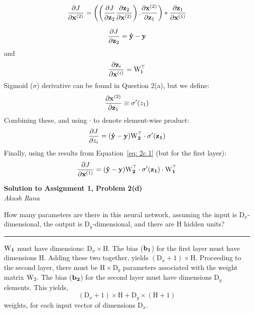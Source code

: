 \documentclass[letter,12pt]{article}
\newcommand{\myhwtitle}[3]
{\begin{center}
{\large {\bf Solution to Assignment {#1}, Problem {#2}}}\\
\medskip
{\it {#3}} %
\end{center}}
\newcommand{\solutionsAuthor}{Akash Rana}
\begin{document}
\begin{equation}
\frac{\partial{J}}{\partial{\bf x}^{(2)}}  = \left( \left(\frac{\partial{J}}{\partial{\bf z}_{2}}  \frac{\partial{\bf z}_{2}}{\partial{\bf x}^{(2)}}\right) . \frac{\partial{\bf x}^{(2)}}{\partial{\bf z}_{1}} \right) * \frac{\partial{\bf z}_{1}}{\partial{\bf x}^{(1)}}
\end{equation}

\begin{equation}
\frac{\partial{J}}{\partial{\bf z}_{2}} = \bf{\hat{y}} - \bf{y}
\end{equation}
and
\begin{equation}
\frac{\partial{\bf z}_{i}}{\partial{{\bf x}^{(i)}}} = {\bf \textrm{W}^{\top}_{i}}\label{eq: 2c 1}
\end{equation}
Sigmoid ($\sigma$) derivative can be found in Question 2(a), but we define:
\begin{equation}
\frac{\partial{{\bf x}^{(2)}}}{\partial{{\bf z}_{1}}}\equiv\sigma^{\prime}(z_{1})%
\end{equation}
Combining these, and using $\cdot$ to denote element-wise product:
\begin{equation}
\frac{\partial{J}}{\partial{z_{i}}} = (\bf{\hat{y}} - \bf{y}){\bf \textrm{W}^{\top}_{2}}\cdot\sigma^{\prime}(z_{1})
\end{equation}
Finally, using the results from Equation~\ref{eq: 2c 1} (but for the first layer):
\begin{equation}
\frac{\partial{J}}{\partial{{\bf x}^{(1)}}} = (\bf{\hat{y}} - \bf{y}){\bf \textrm{W}^{\top}_{2}}\cdot\sigma^{\prime}(z_{1})\cdot{\bf \textrm{W}^{\top}_{1}}
\end{equation}

\clearpage

\myhwtitle{1}{2(d)}{\solutionsAuthor}
\bigskip
\noindent How many parameters are there in this neural network, assuming the input is $\textrm{D}_{x}$-dimensional,
the output is $\textrm{D}_{y}$-dimensional, and there are H hidden units?\vspace{5mm}

\noindent\rule{\textwidth}{0.4pt}

\noindent $\bf{\textrm{W}}_{1}$ must have dimensions:  $\textrm{D}_{x}\times\textrm{H}$. The bias ($\bf{b}_{1}$) for the first layer must have
dimensions $\textrm{H}$. Adding these two together, yields $(\textrm{D}_{x} + 1)\times\textrm{H}$. Proceeding to the second layer,
there must be $\textrm{H}\times\textrm{D}_{y}$ parameters associated with the weight matrix ${\bf\textrm{W}}_{2}$. The bias ($\bf{b}_{2}$)
for the second layer must have dimensions $\textrm{D}_{y}$ elements. This yields, 
\begin{equation}
(\textrm{D}_{x} + 1)\times\textrm{H} + \textrm{D}_{y}\times(\textrm{H}+1)
\end{equation}
weights, for each input vector of dimensions $\textrm{D}_{x}$.
\end{document}
